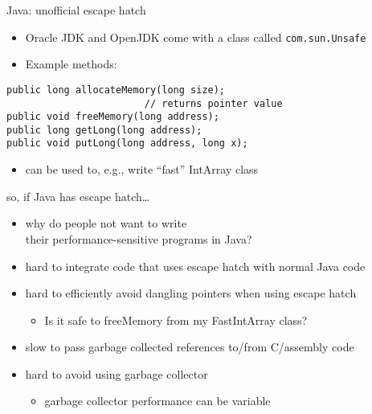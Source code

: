 
\begin{frame}[fragile,label=javaEscapeHatch]{Java: unofficial escape hatch}
    \begin{itemize}
    \item Oracle JDK and OpenJDK come with a class called \texttt{com.sun.Unsafe}
    \item Example methods:
    \end{itemize}
\begin{lstlisting}
public long allocateMemory(long size);
                        // returns pointer value
public void freeMemory(long address);
public long getLong(long address);
public void putLong(long address, long x);
\end{lstlisting}
    \begin{itemize}
    \item can be used to, e.g.,  write ``fast'' IntArray class
    \end{itemize}
\end{frame}


\begin{frame}{so, if Java has escape hatch\ldots}
    \begin{itemize}
    \item why do people not want to write \\ their performance-sensitive programs in Java?
    \vspace{.5cm}
    \item hard to integrate code that uses escape hatch with normal Java code
    \item hard to efficiently avoid dangling pointers when using escape hatch
        \begin{itemize}
        \item Is it safe to freeMemory from my FastIntArray class?
        \end{itemize}
    \item slow to pass garbage collected references to/from C/assembly code
    \item hard to avoid using garbage collector
        \begin{itemize}
        \item garbage collector performance can be variable
        \end{itemize}
    \end{itemize}
\end{frame}
